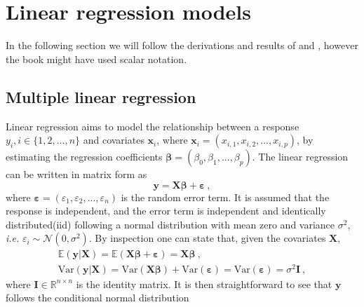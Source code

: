 

\section{Linear regression models}
In the following section we will follow the derivations and results of \citet{GLMM_book} and \citet{GLMM_book_old}, however the book might have used scalar notation.
\subsection{Multiple linear regression}
Linear regression aims to model the relationship between a response $y_i, i\in\{1, 2, ..., n\}$ and covariates $\mathbf{x}_i$, where $\mathbf{x}_i = (x_{i, 1}, x_{i, 2}, ..., x_{i, p})$, by estimating the regression coefficients $\boldsymbol{\beta} = (\beta_0, \beta_1, ..., \beta_p)$. The linear regression can be written in matrix form as
\begin{equation}
    \label{eq:lin_reg}
    \mathbf{y} = \mathbf{X}\boldsymbol{\beta} + \boldsymbol{\varepsilon} \ , 
\end{equation}
where $\boldsymbol{\varepsilon}=(\varepsilon_1, \varepsilon_2, ..., \varepsilon_n)$ is the random error term. It is assumed that the response is independent, and the error term is independent and identically distributed(iid) following a normal distribution with mean zero and variance $\sigma^2$, \textit{i.e.} $\varepsilon_i \sim \mathcal{N}(0, \sigma^2)$. 
By inspection one can state that, given the covariates $\mathbf{X}$, 
\begin{equation}
    \begin{split}
        \mathbb{E}(\mathbf{y} \lvert \mathbf{X}) = \mathbb{E}(\mathbf{X}\boldsymbol{\beta} + \boldsymbol{\varepsilon}) = \mathbf{X}\boldsymbol{\beta} \ ,  \\
        \text{Var}(\mathbf{y} \lvert \mathbf{X}) = \text{Var}(\mathbf{X}\boldsymbol{\beta}) + \text{Var}(\boldsymbol{\varepsilon}) = \text{Var}(\boldsymbol{\varepsilon}) = \sigma^2\mathbf{I} \ ,
    \end{split}
\end{equation}
where $\mathbf{I} \in \mathbb{R}^{n \times n}$ is the identity matrix. 
It is then straightforward to see that $\mathbf{y}$ follows the conditional normal distribution
